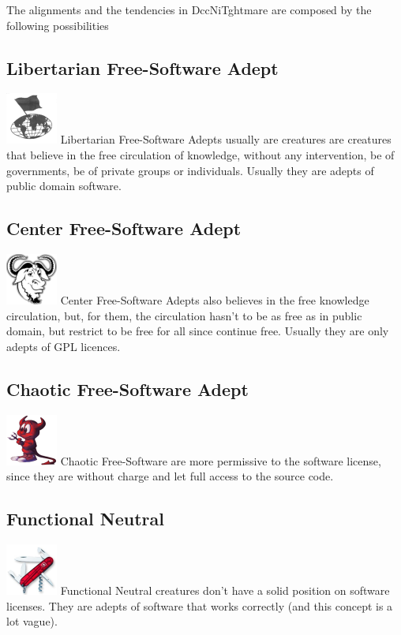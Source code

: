 \documentclass[ letterpaper,12pt]{article}
\begin{document}
The alignments and the tendencies in DccNiTghtmare are composed by the following possibilities\\
\subsection{Libertarian Free-Software Adept}\includegraphics{../data/alignment/Img/libertarian.png} Libertarian Free-Software Adepts usually are creatures are creatures that believe in the free circulation of knowledge, without any intervention, be of governments, be of private groups or individuals. Usually they are adepts of public domain software.
\subsection{Center Free-Software Adept}\includegraphics{../data/alignment/Img/gnu.png} Center Free-Software Adepts also believes in the free knowledge circulation, but, for them, the circulation hasn't to be as free as in public domain, but restrict to be free for all since continue free. Usually they are only adepts of GPL licences.
\subsection{Chaotic Free-Software Adept}\includegraphics{../data/alignment/Img/beastie.png} Chaotic Free-Software are more permissive to the software license, since they are without charge and let full access to the source code.
\subsection{Functional Neutral} \includegraphics{../data/alignment/Img/canivete.png} Functional Neutral creatures don't have a solid position on software licenses. They are adepts of software that works correctly (and this concept is a lot vague).
\end{document}
